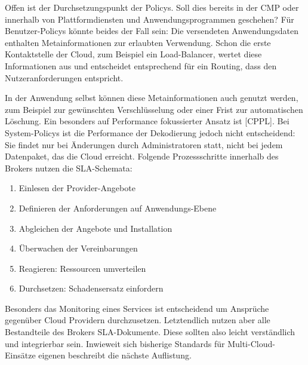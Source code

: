 Offen ist der Durchsetzungspunkt der Policys. Soll dies bereits in der CMP oder innerhalb von Plattformdiensten und Anwendungsprogrammen geschehen? Für Benutzer-Policys könnte beides der Fall sein: Die versendeten Anwendungsdaten enthalten Metainformationen zur erlaubten Verwendung. Schon die erste Kontaktstelle der Cloud, zum Beispiel ein Load-Balancer, wertet diese Informationen aus und entscheidet entsprechend für ein Routing, dass den Nutzeranforderungen entspricht. 

In der Anwendung selbst können diese Metainformationen auch genutzt werden, zum Beispiel zur gewünschten Verschlüsselung oder einer Frist zur automatischen Löschung. Ein besonders auf Performance fokussierter Ansatz ist [CPPL]. Bei System-Policys ist die Performance der Dekodierung jedoch nicht entscheidend: Sie findet nur bei Änderungen durch Administratoren statt, nicht bei jedem Datenpaket, das die Cloud erreicht. Folgende Prozessschritte innerhalb des Brokers nutzen die SLA-Schemata:


\begin{enumerate}
	\item Einlesen der Provider-Angebote
	\item Definieren der Anforderungen auf Anwendungs-Ebene
	\item Abgleichen der Angebote und Installation
	\item Überwachen der Vereinbarungen
	\item Reagieren: Ressourcen umverteilen
	\item Durchsetzen: Schadensersatz einfordern
\end{enumerate}

\noindent
Besonders das Monitoring eines Services ist entscheidend um Ansprüche gegenüber Cloud Providern durchzusetzen. Letztendlich nutzen aber alle Bestandteile des Brokers SLA-Dokumente. Diese sollten also leicht verständlich und integrierbar sein. Inwieweit sich bisherige Standards für Multi-Cloud-Einsätze eigenen beschreibt die nächste Auflistung.

